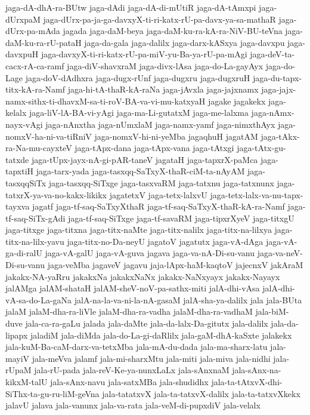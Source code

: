 {jaga-dA-dhA-ra-BUtw
jaga-dAdi
jaga-dA-di-mUtiR
jaga-dA-tAmxpi
jaga-dUrxpaM
jaga-dUrx-pa-ja-ga-davxyX-ti-ri-katx-rU-pa-davx-ya-sa-mathaR
jaga-dUrx-pa-mAda
jagada
jaga-daM-beya
jaga-daM-ku-ra-kA-ra-NiV-BU-teVna
jaga-daM-ku-ra-rU-pataH
jaga-da-gala
jaga-dalilx
jaga-darx-kASxya
jaga-davxpu
jaga-davxpuH
jaga-davxyX-ti-ri-katx-rU-pa-miV-yu-Ba-ya-rU-pa-mAgi
jaga-deV-ta-cacx-rA-ca-ramf
jaga-diV-shavxraM
jaga-divx-lAsa
jaga-do-La-gayAyx
jaga-do-Lage
jaga-doV-dAdhxra
jaga-dugx-rUnf
jaga-dugxru
jaga-dugxruH
jaga-du-tapx-titx-kA-ra-Namf
jaga-hi-tA-thaR-kA-raNa
jaga-jAvxla
jaga-jajxnamx
jaga-jajx-namx-sithx-ti-dhavxM-sa-ti-roV-BA-va-vi-mu-katxyaH
jagake
jagakekx
jaga-kelalx
jaga-liV-lA-BA-vi-yAgi
jaga-ma-Li-gutatxM
jaga-me-lalxma
jaga-nAmx-nayx-vAgi
jaga-nAnxtha
jaga-nUmxlaM
jaga-namx-yamf
jaga-nimxthAyx
jaga-nomxV-ha-ni-va-tiRniV
jaga-nomxV-hi-ni-yeMba
jagaqhuH
jagatAM
jaga-tAkx-ra-Na-mu-cayxteV
jaga-tApx-dana
jaga-tApx-vana
jaga-tAtxgi
jaga-tAtx-gu-tatxde
jaga-tUpx-jayx-nA-gi-pAR-taneV
jagataH
jaga-tapxrX-paMca
jaga-tapxtiH
jaga-tarx-yada
jaga-tasxqq-SaTxyX-thaR-ciM-ta-nAyAM
jaga-tasxqqSiTx
jaga-tasxqq-SiTxge
jaga-tasxvaRM
jaga-tatxnu
jaga-tatxnunx
jaga-tatxrX-ya-va-no-kakx-likikx
jagatetxV
jaga-tetx-lalxvU
jaga-tetx-lalx-va-nu-tapx-tayxva
jagatf
jaga-tf-saq-SaTxyXthaR
jaga-tf-saq-SaTxyX-thaR-kA-ra-Namf
jaga-tf-saq-SiTx-gAdi
jaga-tf-saq-SiTxge
jaga-tf-savaRM
jaga-tipxrXyeV
jaga-titxgU
jaga-titxge
jaga-titxna
jaga-titx-naMte
jaga-titx-nalilx
jaga-titx-na-lilxya
jaga-titx-na-lilx-yavu
jaga-titx-no-Da-neyU
jagatoV
jagatutx
jaga-vA-dAga
jaga-vA-ga-di-ralU
jaga-vA-galU
jaga-vA-guva
jagava
jaga-va-nA-Di-su-vanu
jaga-va-neV-Di-su-vanu
jaga-veMba
jagaveV
jagavu
jaja-lApx-haM-kaqtoV
jajecnxV
jakAraM
jakakx-NA-yaRru
jakakxNa
jakakxNaNx
jakakx-NaNxyayx
jakakx-Nayayx
jalAMga
jalAM-shataH
jalAM-sheV-noV-pa-sathx-miti
jalA-dhi-vAsa
jalA-dhi-vA-sa-do-La-gaNa
jalA-na-la-va-ni-la-nA-gasaM
jalA-sha-ya-dalilx
jala
jala-BUta
jalaM
jalaM-dha-ra-liVle
jalaM-dha-ra-vadha
jalaM-dha-ra-vadhaM
jala-biM-duve
jala-ca-ra-gaLu
jalada
jala-daMte
jala-da-lalx-Da-gitutx
jala-dalilx
jala-da-lipapx
jaladiM
jala-diMda
jala-do-La-gi-daRlilx
jala-gaM-dhA-kaSxte
jalakekx
jala-kuM-Ba-caM-darx-va-tetxMba
jala-mA-du-dada
jala-ma-sharx-latu
jala-mayiV
jala-meVva
jalamf
jala-mi-sharxMtu
jala-miti
jala-miva
jala-nidhi
jala-rUpaM
jala-rU-pada
jala-reV-Ke-ya-nunxLaLx
jala-sAnxnaM
jala-sAnx-na-kikxM-talU
jala-sAnx-navu
jala-satxMBa
jala-shudidhx
jala-ta-tAtxvX-dhi-SiThx-ta-gu-ru-liM-geVna
jala-tatatxvX
jala-ta-tatxvX-dalilx
jala-ta-tatxvXkekx
jalavU
jalava
jala-vanunx
jala-va-rata
jala-veM-di-pupxdiV
jala-velalx
}
